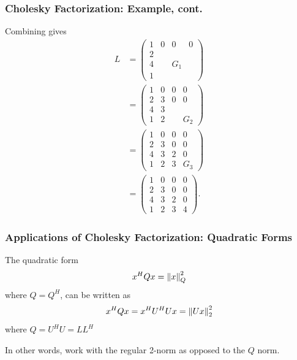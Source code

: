 \documentclass{beamer}
\begin{document}
\begin{frame}\frametitle{Cholesky Factorization: Example, cont.}
	Combining gives
	{\footnotesize
		\begin{align*}
		L 	&= \begin{pmatrix}
					1 & 0 & 0 & 0 \\
					2 &   &   &   \\
					4 &   & G_1 & \\
					1 &   &   & 
				\end{pmatrix} \\
		 	&= \begin{pmatrix}
					1 & 0 & 0 & 0 \\
					2 & 3 & 0 & 0  \\
					4 & 3 &  &  \\
					1 & 2 &   & G_2 
				\end{pmatrix} \\
		 	&= \begin{pmatrix}
					1 & 0 & 0 & 0 \\
					2 & 3 & 0 & 0  \\
					4 & 3 & 2 & 0   \\
					1 & 2 & 3 & G_3 
				\end{pmatrix} \\			 						
			&= \begin{pmatrix}
					1 & 0 & 0 & 0\\
					2 & 3 & 0 & 0\\
					4 & 3 & 2 & 0\\
					1 & 2 & 3 & 4
				\end{pmatrix}.
		\end{align*}
	}
\end{frame}

\begin{frame}\frametitle{Applications of Cholesky Factorization: Quadratic Forms}

	The quadratic form
	\[ 
		x^H Q x = \left\|x \right\|_Q^2
	\]
	where $Q=Q^H$, can be written as
	\[ 
		x^H Qx = x^H U^H Ux = \left\|Ux \right\|_2^2 
	\]
	where $Q = U^HU = LL^H$
	
	\vfill
	In other words, work with the regular 2-norm as opposed to the $Q$ norm.
\end{frame}
\end{document}
